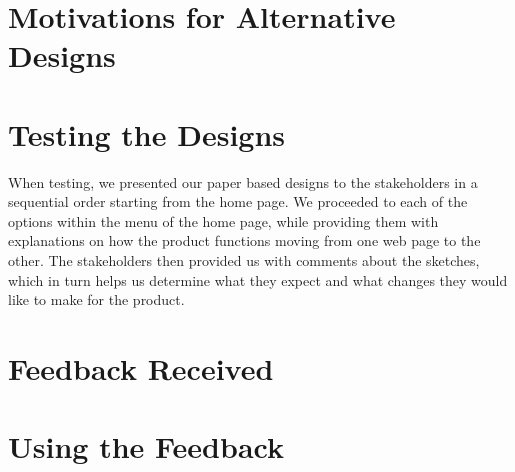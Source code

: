\documentclass[11pt]{article}
\begin{document}
\newpage

\section{Motivations for Alternative Designs}

\section{Testing the Designs}
	When testing, we presented our paper based designs to the stakeholders in a sequential order starting from the home page. We proceeded to each of the options within the menu of the home page, while providing them with explanations on how the product functions moving from one web page to the other. The stakeholders then provided us with comments about the sketches, which in turn helps us determine what they expect and what changes they would like to make for the product.

\section{Feedback Received}

\section{Using the Feedback}
	
\end{document}
